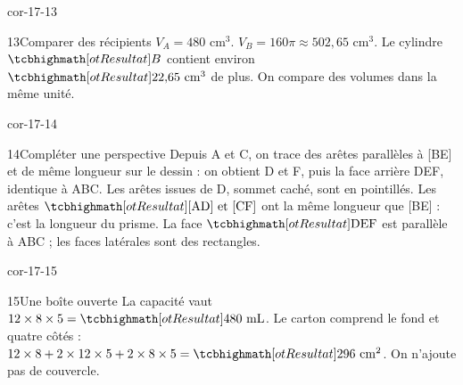 \begin{blocLivre}{cor-17-13}\begin{corrige}{13}{Comparer des récipients}
$V_A=480$ cm$^3$. $V_B=160\pi\approx502{,}65$ cm$^3$. Le cylindre $\res B$ contient environ $\res{22{,}65\ \mathrm{cm}^3}$ de plus. On compare des volumes dans la même unité.
\label{fig-cor-17-13}
\end{corrige}\end{blocLivre}
\begin{blocLivre}{cor-17-14}\begin{corrige}{14}{Compléter une perspective}
Depuis A et C, on trace des arêtes parallèles à [BE] et de même longueur sur le dessin : on obtient D et F, puis la face arrière DEF, identique à ABC. Les arêtes issues de D, sommet caché, sont en pointillés. Les arêtes $\res{\text{[AD] et [CF]}}$ ont la même longueur que [BE] : c’est la longueur du prisme. La face $\res{\text{DEF}}$ est parallèle à ABC ; les faces latérales sont des rectangles.
\label{fig-cor-17-14}
\end{corrige}\end{blocLivre}
\begin{blocLivre}{cor-17-15}\begin{corrige}{15}{Une boîte ouverte}
La capacité vaut $12\times8\times5=\res{480\ \mathrm{mL}}$. Le carton comprend le fond et quatre côtés : $12\times8+2\times12\times5+2\times8\times5=\res{296\ \mathrm{cm}^2}$. On n’ajoute pas de couvercle.
\label{fig-cor-17-15}
\end{corrige}\end{blocLivre}
